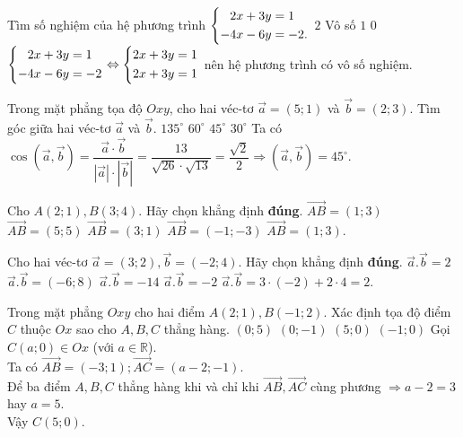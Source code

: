 \begin{ex}%
 Tìm số nghiệm của hệ phương trình $\left\{\begin{aligned}2x+3y&=1 \\ 
 -4x-6y&=-2.\end{aligned}\right.$
\choice
{$2$}
{\True Vô số}
{$1$}
{$0$}
	\loigiai
	{$\left\{\begin{aligned} 2x+3y&=1 \\ 
			 -4x-6y&=-2\end{aligned}\right. \Leftrightarrow \left\{\begin{aligned}& 2x+3y=1 \\ 
			& 2x+3y=1\end{aligned}\right.$ nên hệ phương trình có vô số nghiệm.
	}
\end{ex}
\begin{ex}%
Trong mặt phẳng tọa độ  $Oxy$, cho hai véc-tơ $\overrightarrow{a}=\left( 5;1 \right)$ và $\overrightarrow{b}=\left( 2;3 \right)$. Tìm góc giữa hai véc-tơ $\overrightarrow{a}$ và $\overrightarrow{b}$.
\choice
{$135^\circ$}
{$60^\circ$}
{\True $45^\circ$}
{$30^\circ$}
	\loigiai
	{Ta có $ \cos \left(\vec{a},\vec{b} \right) = \dfrac{\vec{a} \cdot \vec{b}}{|\vec{a}| \cdot |\vec{b}|} = \dfrac{13}{\sqrt{26} \cdot \sqrt{13}} = \dfrac{\sqrt{2}}{2} \Rightarrow \left(\vec{a},\vec{b} \right) = 45^ \circ.$
	}
\end{ex}
\begin{ex}%
Cho  $A\left( 2;1 \right),B\left( 3;4 \right)$. Hãy chọn khẳng định \textbf{đúng}.
\choice
{\True  $\overrightarrow{AB}=\left( 1;3 \right)$}
{$\overrightarrow{AB}=\left( 5;5 \right)$}
{$\overrightarrow{AB}=\left( 3;1 \right)$}
{$\overrightarrow{AB}=\left( -1;-3 \right)$}
	\loigiai
	{$ \vec{AB} =  \left( 1;3 \right).$
	}
\end{ex}
\begin{ex}%
 Cho hai véc-tơ   $\overrightarrow{a}=\left( 3;2 \right),\overrightarrow{b}=\left( -2;4 \right)$. Hãy chọn khẳng định \textbf{đúng}.
\choice
{\True  $\overrightarrow{a}.\overrightarrow{b}=2$}
{$\overrightarrow{a}.\overrightarrow{b}=\left( -6;8 \right)$}
{$\overrightarrow{a}.\overrightarrow{b}=-14$}
{$\overrightarrow{a}.\overrightarrow{b}=-2$}
	\loigiai
	{$\overrightarrow{a}.\overrightarrow{b}=3 \cdot (-2) + 2 \cdot 4 = 2$.
	}
\end{ex}
\begin{ex}%
Trong mặt phẳng  $Oxy$ cho hai điểm  $A(2;1),B(-1;2)$. Xác định tọa độ điểm  $C$  thuộc  $Ox$  sao cho $A,B,C$  thẳng hàng.
\choice
{$(0;{ 5})$}
{$(0;-1)$}
{\True  $(5;0)$}
{$(-1;0)$}
	\loigiai
	{Gọi $ C(a;0) \in Ox $ (với $ a \in \mathbb{R} $).  \\
		Ta có $ \vec{AB} = (-3;1); \vec{AC} = (a-2;-1) $.\\
		Để ba điểm $ A, B, C $ thẳng hàng khi và chỉ khi $ \vec{AB}, \vec{AC} $ cùng phương $ \Rightarrow a - 2 = 3  $ hay $ a = 5. $\\
		Vậy $ C(5;0). $
	}
\end{ex}
